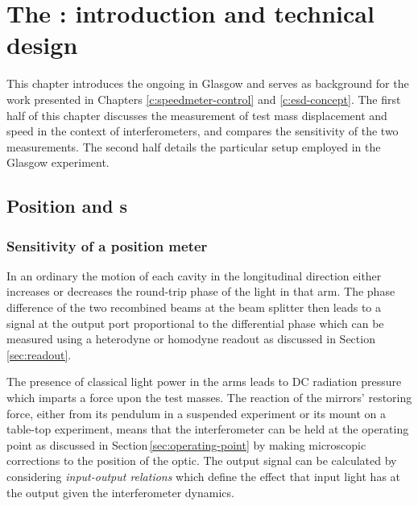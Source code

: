 \chapter{\label{c:speedmeter-intro}The \SSMEXPT{}: introduction and technical design}

This chapter introduces the ongoing \SSMEXPT{} in Glasgow and serves as background for the work presented in Chapters \ref{c:speedmeter-control} and \ref{c:esd-concept}. The first half of this chapter discusses the measurement of test mass displacement and speed in the context of interferometers, and compares the sensitivity of the two measurements. The second half details the particular setup employed in the Glasgow experiment.

\section{\label{sec:pos-speed-meters}Position and \SM{}s}

\subsection{\label{sec:position-meter-measurement}Sensitivity of a position meter}
In an ordinary \FPMI{} the motion of each cavity in the longitudinal direction either increases or decreases the round-trip phase of the light in that arm. The phase difference of the two recombined beams at the beam splitter then leads to a signal at the output port proportional to the differential phase which can be measured using a heterodyne or homodyne readout as discussed in Section\,\ref{sec:readout}.

The presence of classical light power in the arms leads to \gls{DC} radiation pressure which imparts a force upon the test masses. The reaction of the mirrors' restoring force, either from its pendulum in a suspended experiment or its mount on a table-top experiment, means that the interferometer can be held at the operating point as discussed in Section\,\ref{sec:operating-point} by making microscopic corrections to the position of the optic. The output signal can be calculated by considering \emph{input-output relations} which define the effect that input light has at the output given the interferometer dynamics.

